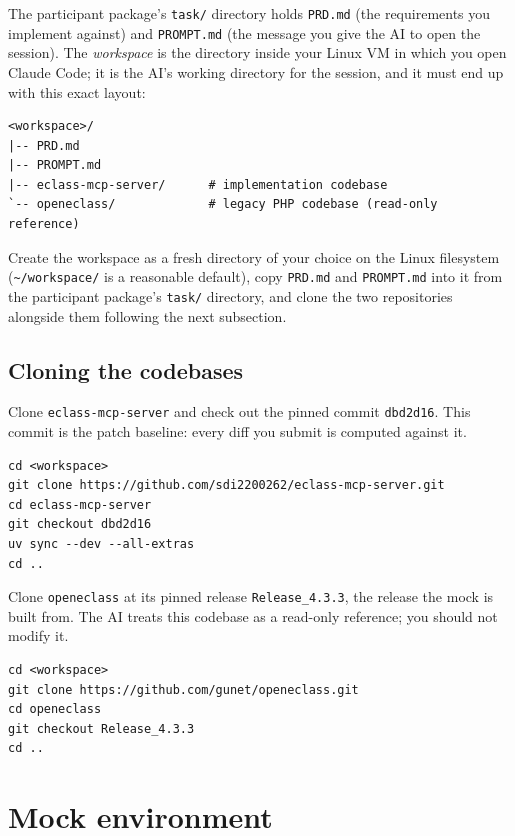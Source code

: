 \documentclass[11pt, a4paper]{article}
\begin{document}
The participant package's \texttt{task/} directory holds \texttt{PRD.md} (the requirements you implement against) and \texttt{PROMPT.md} (the message you give the AI to open the session). The \emph{workspace} is the directory inside your Linux VM in which you open Claude Code; it is the AI's working directory for the session, and it must end up with this exact layout:

\begin{verbatim}
<workspace>/
|-- PRD.md
|-- PROMPT.md
|-- eclass-mcp-server/      # implementation codebase
`-- openeclass/             # legacy PHP codebase (read-only reference)
\end{verbatim}

Create the workspace as a fresh directory of your choice on the Linux filesystem (\texttt{\textasciitilde/workspace/} is a reasonable default), copy \texttt{PRD.md} and \texttt{PROMPT.md} into it from the participant package's \texttt{task/} directory, and clone the two repositories alongside them following the next subsection.

\subsection{Cloning the codebases}
\label{sec:cloning}

Clone \texttt{eclass-mcp-server} and check out the pinned commit \texttt{dbd2d16}. This commit is the patch baseline: every diff you submit is computed against it.

\begin{verbatim}
cd <workspace>
git clone https://github.com/sdi2200262/eclass-mcp-server.git
cd eclass-mcp-server
git checkout dbd2d16
uv sync --dev --all-extras
cd ..
\end{verbatim}

Clone \texttt{openeclass} at its pinned release \texttt{Release\_4.3.3}, the release the mock is built from. The AI treats this codebase as a read-only reference; you should not modify it.

\begin{verbatim}
cd <workspace>
git clone https://github.com/gunet/openeclass.git
cd openeclass
git checkout Release_4.3.3
cd ..
\end{verbatim}

\section{Mock environment}
\label{sec:env}
\end{document}

